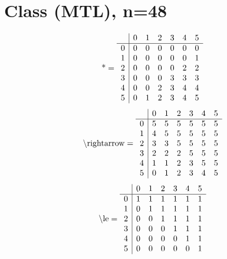 \documentclass[11pt]{article}
\begin{document}
\section{Class (MTL), n=48}
\[\text{*} = 
\begin{array}{r | r r r r r r}
 & 0 & 1 & 2 & 3 & 4 & 5 \\ \hline
0 & 0 & 0 & 0 & 0 & 0 & 0 \\
1 & 0 & 0 & 0 & 0 & 0 & 1 \\
2 & 0 & 0 & 0 & 0 & 2 & 2 \\
3 & 0 & 0 & 0 & 3 & 3 & 3 \\
4 & 0 & 0 & 2 & 3 & 4 & 4 \\
5 & 0 & 1 & 2 & 3 & 4 & 5 \\
\end{array}
\]
\[\text{\textbackslash rightarrow} = 
\begin{array}{r | r r r r r r}
 & 0 & 1 & 2 & 3 & 4 & 5 \\ \hline
0 & 5 & 5 & 5 & 5 & 5 & 5 \\
1 & 4 & 5 & 5 & 5 & 5 & 5 \\
2 & 3 & 3 & 5 & 5 & 5 & 5 \\
3 & 2 & 2 & 2 & 5 & 5 & 5 \\
4 & 1 & 1 & 2 & 3 & 5 & 5 \\
5 & 0 & 1 & 2 & 3 & 4 & 5 \\
\end{array}
\]
\[\text{\textbackslash le} = 
\begin{array}{r | r r r r r r}
 & 0 & 1 & 2 & 3 & 4 & 5 \\ \hline
0 & 1 & 1 & 1 & 1 & 1 & 1 \\
1 & 0 & 1 & 1 & 1 & 1 & 1 \\
2 & 0 & 0 & 1 & 1 & 1 & 1 \\
3 & 0 & 0 & 0 & 1 & 1 & 1 \\
4 & 0 & 0 & 0 & 0 & 1 & 1 \\
5 & 0 & 0 & 0 & 0 & 0 & 1 \\
\end{array}
\]
\end{document}
